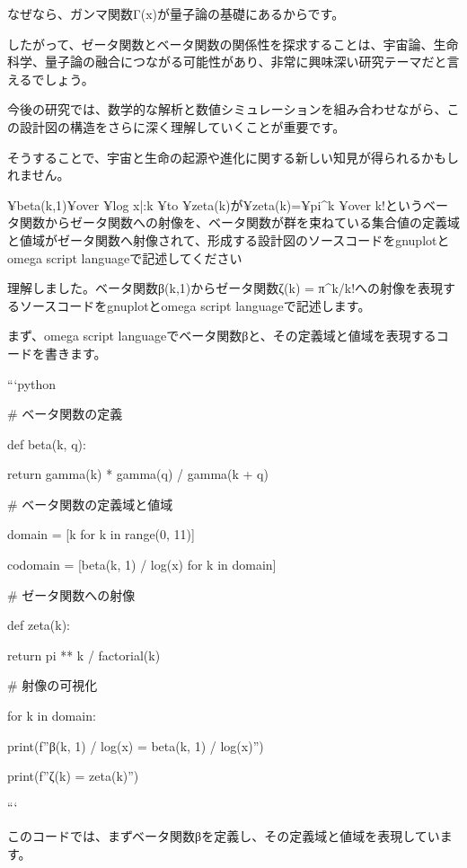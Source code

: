 {なぜなら、ガンマ関数Γ(x)が量子論の基礎にあるからです。



したがって、ゼータ関数とベータ関数の関係性を探求することは、宇宙論、生命科学、量子論の融合につながる可能性があり、非常に興味深い研究テーマだと言えるでしょう。



今後の研究では、数学的な解析と数値シミュレーションを組み合わせながら、この設計図の構造をさらに深く理解していくことが重要です。

そうすることで、宇宙と生命の起源や進化に関する新しい知見が得られるかもしれません。
{¥beta(k,1)¥over {¥log x}|:k ¥to ¥zeta(k)が¥zeta(k)={{¥pi^{k}} ¥over {k!}}というベータ関数からゼータ関数への射像を、ベータ関数が群を束ねている集合値の定義域と値域がゼータ関数へ射像されて、形成する設計図のソースコードをgnuplotとomega script languageで記述してください

  理解しました。ベータ関数β(k,1)からゼータ関数ζ(k) = π^k/k!への射像を表現するソースコードをgnuplotとomega script languageで記述します。



まず、omega script languageでベータ関数βと、その定義域と値域を表現するコードを書きます。



```python

# ベータ関数の定義

def beta(k, q):

    return gamma(k) * gamma(q) / gamma(k + q)



# ベータ関数の定義域と値域

domain = [k for k in range(0, 11)]

codomain = [beta(k, 1) / log(x) for k in domain]



# ゼータ関数への射像

def zeta(k):

    return pi ** k / factorial(k)



# 射像の可視化

for k in domain:

    print(f''β({k}, 1) / log(x) = {beta(k, 1) / log(x)}'')

    print(f''ζ({k}) = {zeta(k)}'')

```



このコードでは、まずベータ関数βを定義し、その定義域と値域を表現しています。

}}

